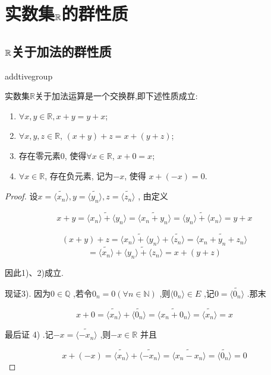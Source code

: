 \section{实数集$\mathbb{R}$的群性质}


\subsection{$\mathbb{R}$关于加法的群性质}
	\label{sec:2-2-1}

\begin{mythm}{}{addtivegroup}

实数集$\mathbb{R}$关于加法运算是一个交换群,即下述性质成立:

\begin{enumerate}[label=\arabic*)]
	\item \(\forall x, y \in \mathbb{R}, x + y = y + x\);
	\item \(\forall x,y,z \in \mathbb{R}\), \((x+y)+z = x+(y+z)\);
	\item 存在零元素0, 使得\(\forall x \in \mathbb{R}\), \(x + 0 = x\);
	\item \(\forall x \in \mathbb{R}\), 存在负元素, 记为\(-x\), 使得 \(x + (-x) = 0\).
\end{enumerate}

\end{mythm}

\begin{proof}

设$x = \widetilde{\langle x_n \rangle} , y = \widetilde{\langle y_n \rangle}, z = \widetilde{\langle z_n \rangle}$ , 由定义


	\[x + y = \widetilde{\langle x_n \rangle + \langle y_n \rangle}  = \widetilde{\langle x_n + y_n \rangle} = \widetilde{\langle y_n \rangle + \langle x_n \rangle} = y + x\] 
	 
	\[(x + y) + z = \widetilde{\langle x_n \rangle + \langle y_n \rangle} + \widetilde{\langle z_n \rangle} = \widetilde{\langle x_n + y_n + z_n \rangle}\]
	\[= \widetilde{\langle x_n \rangle} + \widetilde{\langle y_n \rangle + \langle z_n \rangle} = x + (y + z)\] 

因此1)、2)成立.

现证3). 因为\(0 \in \mathbb{Q}\) ,若令\(0_n = 0 (\forall n \in \mathbb{N})\) ,则\(\langle 0_n \rangle \in E\) ,记\(0 = \widetilde{\langle 0_n \rangle}\) .那末

\[x + 0 = \widetilde{\langle x_n \rangle} + \widetilde{\langle 0_n \rangle} = \widetilde{\langle x_n + 0_n \rangle} = \widetilde{\langle x_n \rangle} = x\]

最后证 4) .记\(-x = \widetilde{\langle -x_n \rangle}\) ,则\(-x \in \mathbb{R}\) 并且

\[x + (-x) = \widetilde{\langle x_n \rangle} + \widetilde{\langle -x_n \rangle} = \widetilde{\langle x_n - x_n \rangle} = \widetilde{\langle 0_n \rangle} = 0\]

\end{proof}

